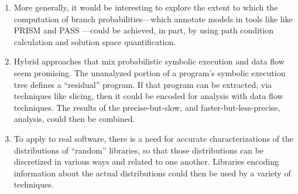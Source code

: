 \begin{enumerate}
\item More generally, it would be interesting to explore the extent
to which the computation of branch probabilities---which annotate
models in tools like like PRISM \cite{kwiatkowska2011prism} and 
PASS \cite{hahn2010pass}---could be achieved,
in part, by using path condition calculation and solution
space quantification.

\item Hybrid approaches that mix probabilistic symbolic execution
and data flow seem promising.  The unanalyzed portion of a program's
symbolic execution tree defines a ``residual'' program.  If that
program can be extracted, via techniques like slicing, then it
could be encoded for analysis with data flow techniques.  The
results of the precise-but-slow, and faster-but-less-precise,
analysis, could then be combined. 

\item To apply to real software, there is a need for accurate characterizations
of the distributions of ``random'' libraries, so that those distributions 
can be discretized in various ways and related to one another.  Libraries
encoding information about the actual distributions could then be used
by a variety of techniques.

\end{enumerate}
